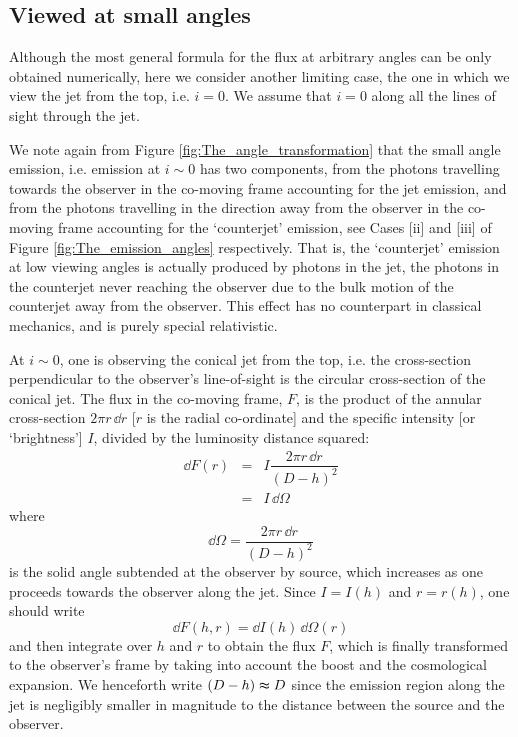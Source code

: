 \subsection{Viewed at small angles}
Although the most general formula for the flux at arbitrary angles can be only obtained numerically, here we consider another limiting case, the one in which we view the jet from the top, i.e. $i = 0$. We assume that $i = 0$ along all the lines of sight through the jet.

We note again from Figure \ref{fig:The_angle_transformation} that the small angle emission, i.e. emission at $ i \sim 0 $ has two components, from the photons travelling towards the observer in the co-moving frame accounting for the jet emission, and from the photons travelling in the direction away from the observer in the co-moving frame accounting for the `counterjet' emission, see Cases [ii] and [iii] of Figure \ref{fig:The_emission_angles} respectively. That is, the `counterjet' emission at low viewing angles is actually produced by photons in the jet, the photons in the counterjet never reaching the observer due to the bulk motion of the counterjet away from the observer. This effect has no counterpart in classical mechanics, and is purely special relativistic.

At $i \sim 0$, one is observing the conical jet from the top, i.e. the cross-section perpendicular to the observer's line-of-sight is the circular cross-section of the conical jet. The flux in the co-moving frame, $F$, is the product of the annular cross-section $ 2 \pi r \, \dd r $ [$r$ is the radial co-ordinate] and the specific intensity [or `brightness'] $I$, divided by the luminosity distance squared:
\begin{eqnarray}
\dd F(r) & = & I \dfrac{2 \pi r \, \dd r}{ (D-h)^2 }\\
 & = & I \, \dd \Omega
\end{eqnarray}
where
\begin{equation}
\dd \Omega = \dfrac{2 \pi r \, \dd r}{ (D-h)^2 }
\end{equation}
is the solid angle subtended at the observer by source, which increases as one proceeds towards the observer along the jet. Since $I = I(h)$ and $r = r(h)$, one should write 
\begin{equation}
\dd F(h, r) = \dd I(h) \, \dd \Omega (r)
\label{eq:flux_from_brightness}
\end{equation}
and then integrate over $h$ and $r$ to obtain the flux $F$, which is finally transformed to the observer's frame by taking into account the boost and the cosmological expansion. We henceforth write $ (D-h) \thickapprox D $ since the emission region along the jet is negligibly smaller in magnitude to the distance between the source and the observer.

